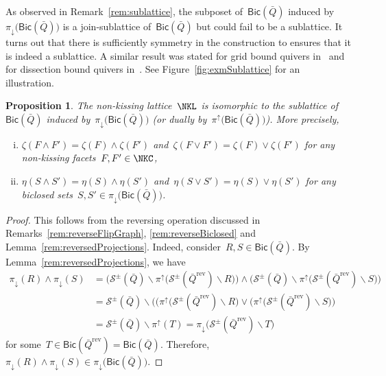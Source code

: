 \documentclass{amsart}
\newtheorem{proposition}[theorem]{Proposition}
\theoremstyle{definition}
\newcommand{\ssm}{\smallsetminus} %
\newcommand{\fref}[1]{Figure~\ref{#1}} %
\newcommand{\strings}{\mathcal{S}} %
\newcommand{\reversed}[1]{#1^{\mathrm{rev}}} %
\newcommand{\meet}{\wedge} %
\newcommand{\join}{\vee} %
\newcommand{\Bicl}[1]{\mathsf{Bic}(#1)} %
\newcommand{\projDown}{\pi_\downarrow} %
\newcommand{\projUp}{\pi^\uparrow} %
\begin{document}
As observed in Remark~\ref{rem:sublattice}, the subposet of~$\Bicl{\bar Q}$ induced by~$\projDown \big( \Bicl{\bar Q} \big)$ is a join-sublattice of~$\Bicl{\bar Q}$ but could fail to be a sublattice.
It turns out that there is sufficiently symmetry in the construction to ensures that it is indeed a sublattice.
A similar result was stated for grid bound quivers in~\cite[Lem.~4.5]{GarverMcConville-grid} and for dissection bound quivers in~\cite[Thm.~4.11]{GarverMcConville}.
See \fref{fig:exmSublattice} for an illustration.

\begin{proposition}
\label{prop:sublattice}
The non-kissing lattice~$\NKL$ is isomorphic to the sublattice of~$\Bicl{\bar Q}$ induced by~$\projDown \big( \Bicl{\bar Q} \big)$ (or dually by~$\projUp \big( \Bicl{\bar Q} \big)$). More precisely,
\begin{enumerate}[(i)]
\item $\zeta(F \meet F') = \zeta(F) \meet \zeta(F')$ and~$\zeta(F \join F') = \zeta(F) \join \zeta(F')$ for any non-kissing facets~${F, F' \in \NKC}$,
\item $\eta(S \meet S') = \eta(S) \meet \eta(S')$ and~$\eta(S \join S') = \eta(S) \join \eta(S')$ for any biclosed sets~$S, S' \in \projDown \big( \Bicl{\bar Q} \big)$.
\end{enumerate}
\end{proposition}

\begin{proof}
This follows from the reversing operation discussed in Remarks~\ref{rem:reverseFlipGraph}, \ref{rem:reverseBiclosed} and Lemma~\ref{rem:reversedProjections}.
Indeed, consider~$R, S \in \Bicl{\bar Q}$.
By Lemma~\ref{rem:reversedProjections}, we have
\begin{align*}
\projDown(R) \meet \projDown(S) 
& = \big( \strings^\pm(\bar Q) \ssm \projUp\big( \strings^\pm(\reversed{\bar Q}) \ssm R \big) \big) \meet \big( \strings^\pm(\bar Q) \ssm \projUp\big( \strings^\pm(\reversed{\bar Q}) \ssm S \big) \big) \\
& = \strings^\pm(\bar Q) \ssm \big(  \big( \projUp\big( \strings^\pm(\reversed{\bar Q}) \ssm R \big) \join \big( \projUp\big( \strings^\pm(\reversed{\bar Q}) \ssm S \big) \big) \\
& = \strings^\pm(\bar Q) \ssm \projUp(T) = \projDown\big( \strings^\pm(\reversed{\bar Q}) \ssm T \big)
\end{align*}
for some~$T \in \Bicl{\reversed{\bar Q}} = \Bicl{\bar Q}$.
Therefore, $\projDown(R) \meet \projDown(S) \in \projDown \big( \Bicl{\bar Q} \big)$.
\end{proof}
\end{document}
